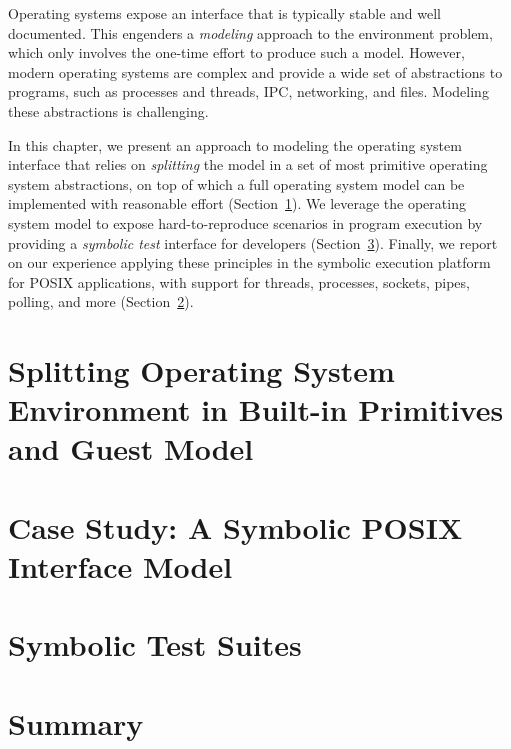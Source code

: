 
Operating systems expose an interface that is typically stable and well documented.
%
This engenders a \emph{modeling} approach to the environment problem, which only involves the one-time effort to produce such a model.
%
However, modern operating systems are complex and provide a wide set of abstractions to programs, such as processes and threads, IPC, networking, and files.  Modeling these abstractions is challenging.

In this chapter, we present an approach to modeling the operating system interface that relies on \emph{splitting} the model in a set of most primitive operating system abstractions, on top of which a full operating system model can be implemented with reasonable effort (Section~\ref{sec:cloud9:splitmodel}).
%
We leverage the operating system model to expose hard-to-reproduce scenarios in program execution by providing a \emph{symbolic test} interface for developers (Section~\ref{sec:cloud9:symtests}).
%
Finally, we report on our experience applying these principles in the \cnine symbolic execution platform for POSIX applications, with support for threads, processes, sockets, pipes, polling, and more (Section~\ref{sec:cloud9:posix}).


\section{Splitting Operating System Environment in Built-in Primitives and Guest Model}
\label{sec:cloud9:splitmodel}


\section{Case Study: A Symbolic POSIX Interface Model}
\label{sec:cloud9:posix}


\section{Symbolic Test Suites}
\label{sec:cloud9:symtests}


\section{Summary}

